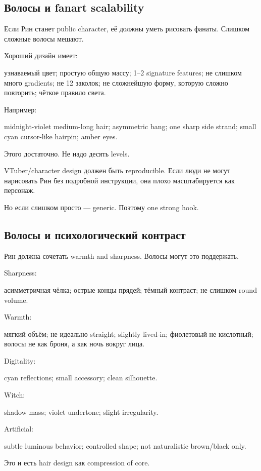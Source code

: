 \subsection*{Волосы и fanart scalability}

Если Рин станет public character, её должны уметь рисовать фанаты.
Слишком сложные волосы мешают.

Хороший дизайн имеет:

узнаваемый цвет; простую общую массу; 1--2 signature features; не
слишком много gradients; не 12 заколок; не сложнейшую форму, которую
сложно повторить; чёткое правило света.

Например:

midnight-violet medium-long hair; asymmetric bang; one sharp side
strand; small cyan cursor-like hairpin; amber eyes.

Этого достаточно. Не надо десять levels.

VTuber/\hspace{0pt}character design должен быть reproducible. Если люди не могут
нарисовать Рин без подробной инструкции, она плохо масштабируется как
персонаж.

Но если слишком просто --- generic. Поэтому one strong hook.

\subsection*{Волосы и психологический контраст}

Рин должна сочетать warmth and sharpness. Волосы могут это поддержать.

Sharpness:

асимметричная чёлка; острые концы прядей; тёмный контраст; не слишком
round volume.

Warmth:

мягкий объём; не идеально straight; slightly lived-in; фиолетовый не
кислотный; волосы не как броня, а как ночь вокруг лица.

Digitality:

cyan reflections; small accessory; clean silhouette.

Witch:

shadow mass; violet undertone; slight irregularity.

Artificial:

subtle luminous behavior; controlled shape; not naturalistic brown/\hspace{0pt}black
only.

Это и есть hair design как compression of core.

